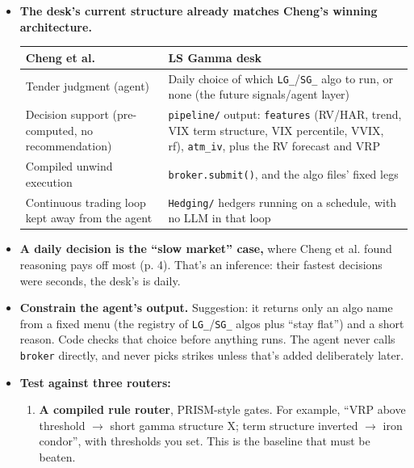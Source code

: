 \documentclass{article}
\begin{document}
\begin{itemize}

\item \textbf{The desk's current structure already matches Cheng's winning architecture.}

\begin{center}\small
\begin{tabularx}{\linewidth}{>{\raggedright\arraybackslash}X >{\raggedright\arraybackslash}X}
\toprule
\textbf{Cheng et al.} & \textbf{LS Gamma desk} \\
\midrule
Tender judgment (agent) & Daily choice of which \texttt{LG\_\allowbreak{}}/\allowbreak{}\texttt{SG\_\allowbreak{}} algo to run, or none (the future signals/\allowbreak{}agent layer) \\
Decision support (pre-computed, no recommendation) & \texttt{pipeline/\allowbreak{}} output: \texttt{features} (RV/\allowbreak{}HAR, trend, VIX term structure, VIX percentile, VVIX, rf), \texttt{atm\_\allowbreak{}iv}, plus the RV forecast and VRP \\
Compiled unwind execution & \texttt{broker.\allowbreak{}submit()}, and the algo files' fixed legs \\
Continuous trading loop kept away from the agent & \texttt{Hedging/\allowbreak{}} hedgers running on a schedule, with no LLM in that loop \\
\bottomrule
\end{tabularx}
\end{center}

\item \textbf{A daily decision is the ``slow market'' case,} where Cheng et al. found reasoning pays off most (p. 4). That's an inference: their fastest decisions were seconds, the desk's is daily.

\item \textbf{Constrain the agent's output.} Suggestion: it returns only an algo name from a fixed menu (the registry of \texttt{LG\_\allowbreak{}}/\allowbreak{}\texttt{SG\_\allowbreak{}} algos plus ``stay flat'') and a short reason. Code checks that choice before anything runs. The agent never calls \texttt{broker} directly, and never picks strikes unless that's added deliberately later.

\item \textbf{Test against three routers:}

\begin{enumerate}

\item \textbf{A compiled rule router}, PRISM-style gates. For example, ``VRP above threshold \ensuremath{\rightarrow} short gamma structure X; term structure inverted \ensuremath{\rightarrow} iron condor'', with thresholds you set. This is the baseline that must be beaten.


\end{enumerate}
\end{itemize}
\end{document}

